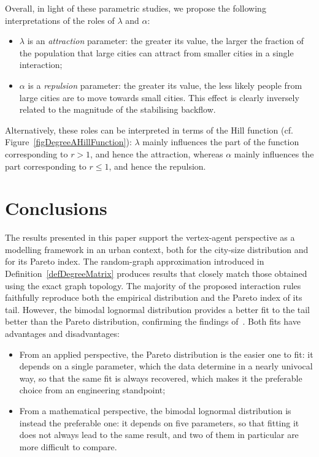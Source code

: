 \documentclass[a4paper]{article}
\begin{document}
Overall, in light of these parametric studies, we propose the following interpretations of the roles of $\lambda$ and $\alpha$:
\begin{itemize}
\item $\lambda$ is an \textit{attraction} parameter: the greater its value, the larger the fraction of the population that large cities can attract from smaller cities in a single interaction;
\item $\alpha$ is a \textit{repulsion} parameter: the greater its value, the less likely people from large cities are to move towards small cities. This effect is clearly inversely related to the magnitude of the stabilising backflow.
\end{itemize}
Alternatively, these roles can be interpreted in terms of the Hill function (cf. Figure~\ref{figDegreeAHillFunction}): $\lambda$ mainly influences the part of the function corresponding to $r>1$, and hence the attraction, whereas $\alpha$ mainly influences the part corresponding to $r\leq 1$, and hence the repulsion.

\section{Conclusions}
\label{secConclusions}
%
The results presented in this paper support the vertex-agent perspective as a modelling framework in an urban context, both for the city-size distribution and for its Pareto index. The random-graph approximation introduced in Definition~\ref{defDegreeMatrix} produces results that closely match those obtained using the exact graph topology. The majority of the proposed interaction rules faithfully reproduce both the empirical distribution and the Pareto index of its tail. However, the bimodal lognormal distribution provides a better fit to the tail better than the Pareto distribution, confirming the findings of~\cite{Gualandi2019SDC,Gualandi2019HBLD}. Both fits have advantages and disadvantages:
\begin{itemize}
    \item From an applied perspective, the Pareto distribution is the easier one to fit: it depends on a single parameter, which the data determine in a nearly univocal way, so that the same fit is always recovered, which makes it the preferable choice from an engineering standpoint;
    \item From a mathematical perspective, the bimodal lognormal distribution is instead the preferable one: it depends on five parameters, so that fitting it does not always lead to the same result, and two of them in particular are more difficult to compare.
\end{itemize}
\end{document}

